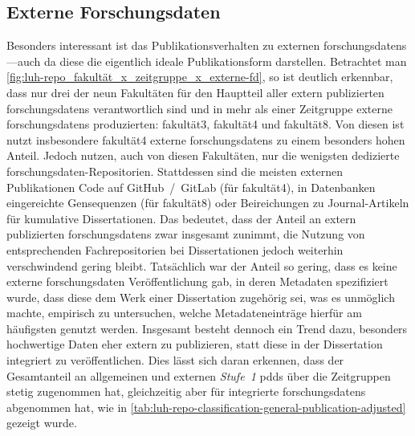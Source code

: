 \subsection{Externe Forschungsdaten}
Besonders interessant ist das Publikationsverhalten zu externen \glspl{forschungsdaten}---auch da diese die eigentlich ideale Publikationsform darstellen.
Betrachtet man \cref{fig:luh-repo_fakultät_x_zeitgruppe_x_externe-fd}, so ist deutlich erkennbar, dass nur drei der neun Fakultäten für den Hauptteil aller extern publizierten \glspl{forschungsdaten} verantwortlich sind und in mehr als einer Zeitgruppe externe \glspl{forschungsdaten} produzierten: \gls{fakultät3}, \gls{fakultät4} und \gls{fakultät8}.
Von diesen ist nutzt insbesondere \gls{fakultät4} externe \glspl{forschungsdaten} zu einem besonders hohen Anteil.
Jedoch nutzen, auch von diesen Fakultäten, nur die wenigsten dedizierte \gls{forschungsdaten}-Repositorien.
Stattdessen sind die meisten externen Publikationen Code auf GitHub~/~GitLab (für \gls{fakultät4}), in Datenbanken eingereichte Gensequenzen (für \gls{fakultät8}) oder Beireichungen zu Journal-Artikeln für kumulative Dissertationen.
Das bedeutet, dass der Anteil an extern publizierten \glspl{forschungsdaten} zwar insgesamt zunimmt, die Nutzung von entsprechenden Fachrepositorien bei Dissertationen jedoch weiterhin verschwindend gering bleibt.
Tatsächlich war der Anteil so gering, dass es keine externe \gls{forschungsdaten} Veröffentlichung gab, in deren Metadaten spezifiziert wurde, dass diese dem Werk einer Dissertation zugehörig sei, was es unmöglich machte, empirisch zu untersuchen, welche Metadateneinträge hierfür am häufigsten genutzt werden.
Insgesamt besteht dennoch ein Trend dazu, besonders hochwertige Daten eher extern zu publizieren, statt diese in der Dissertation integriert zu veröffentlichen.
Dies lässt sich daran erkennen, dass der Gesamtanteil an allgemeinen und externen \textit{Stufe~1} \glspl{pdd} über die Zeitgruppen stetig zugenommen hat, gleichzeitig aber für integrierte \glspl{forschungsdaten} abgenommen hat, wie in \cref{tab:luh-repo-classification-general-publication-adjusted} gezeigt wurde.

